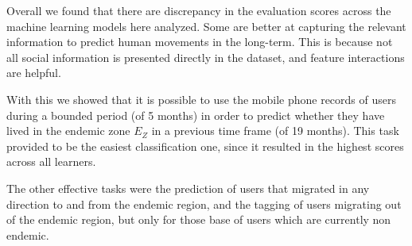 Overall we found that there are discrepancy in the evaluation scores across the machine learning models here analyzed.
Some are better at capturing the relevant information to predict human movements in the long-term.
This is because not all social information is presented directly in the dataset, and feature interactions are helpful.

With this we showed that it is possible to use the mobile phone records of users during a bounded period (of 5 months) in order to predict whether they have lived in the endemic zone $E_Z$ in a previous time frame (of 19 months).
This task provided to be the easiest classification one, since it resulted in the highest scores across all learners.

The other effective tasks were the prediction of users that migrated in any direction to and from the endemic region, and the tagging of users migrating out of the endemic region, but only for those base of users which are currently non endemic.







